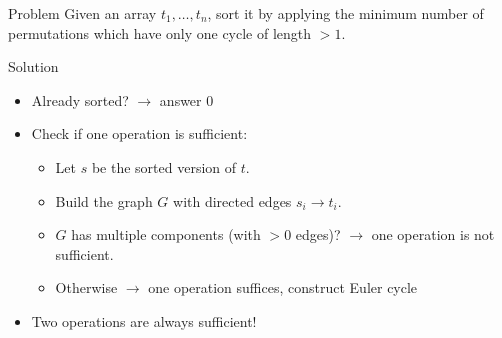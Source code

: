 \begin{frame}{\problemtitle}
	\begin{block}{Problem}
		Given an array $t_1, \ldots, t_n$, sort it by applying the minimum number of permutations
		which have only one cycle of length $> 1$. 
	\end{block}
	\pause
	\begin{block}{Solution}
		\begin{itemize}
			\item Already sorted? $\rightarrow$ answer $0$
			\pause
			\item Check if one operation is sufficient:
			\begin{itemize}
				\item Let $s$ be the sorted version of $t$.
				\item Build the graph $G$ with directed edges $s_i \rightarrow t_i$.
				\pause
				\item $G$ has multiple components (with $>0$ edges)? $\rightarrow$ one operation is not sufficient.
				\item Otherwise $\rightarrow$ one operation suffices, construct Euler cycle 
			\end{itemize}
			\pause
			\item Two operations are always sufficient!
		\end{itemize}
	\end{block}
\end{frame}

